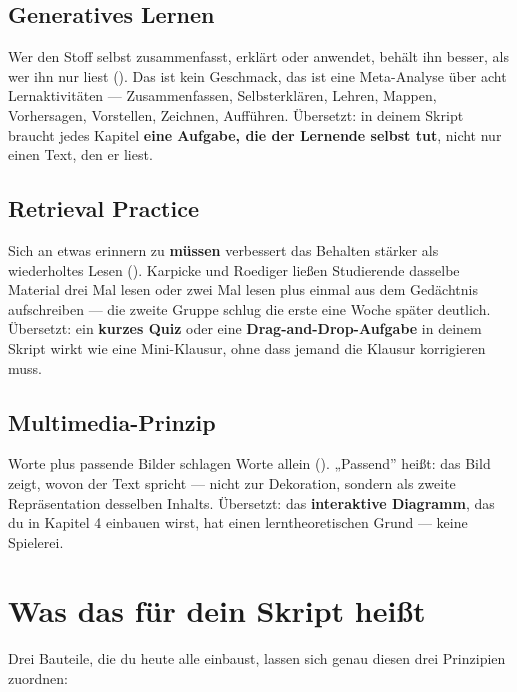 \documentclass[
  ngerman,
  a4paper,
  DIV=11]{scrreprt}
\begin{document}
\subsection{Generatives Lernen}\label{generatives-lernen}

Wer den Stoff selbst zusammenfasst, erklärt oder anwendet, behält ihn
besser, als wer ihn nur liest (). Das ist kein Geschmack, das ist eine Meta-Analyse über
acht Lernaktivitäten --- Zusammenfassen, Selbsterklären, Lehren, Mappen,
Vorhersagen, Vorstellen, Zeichnen, Aufführen. Übersetzt: in deinem
Skript braucht jedes Kapitel \textbf{eine Aufgabe, die der Lernende
selbst tut}, nicht nur einen Text, den er liest.

\subsection{Retrieval Practice}\label{retrieval-practice}

Sich an etwas erinnern zu \textbf{müssen} verbessert das Behalten
stärker als wiederholtes Lesen (). Karpicke und Roediger ließen Studierende dasselbe
Material drei Mal lesen oder zwei Mal lesen plus einmal aus dem
Gedächtnis aufschreiben --- die zweite Gruppe schlug die erste eine
Woche später deutlich. Übersetzt: ein \textbf{kurzes Quiz} oder eine
\textbf{Drag-and-Drop-Aufgabe} in deinem Skript wirkt wie eine
Mini-Klausur, ohne dass jemand die Klausur korrigieren muss.

\subsection{Multimedia-Prinzip}\label{multimedia-prinzip}

Worte plus passende Bilder schlagen Worte allein
(). „Passend'' heißt: das Bild
zeigt, wovon der Text spricht --- nicht zur Dekoration, sondern als
zweite Repräsentation desselben Inhalts. Übersetzt: das
\textbf{interaktive Diagramm}, das du in Kapitel 4 einbauen wirst, hat
einen lerntheoretischen Grund --- keine Spielerei.

\section{Was das für dein Skript
heißt}\label{was-das-fuxfcr-dein-skript-heiuxdft}

Drei Bauteile, die du heute alle einbaust, lassen sich genau diesen drei
Prinzipien zuordnen:
\end{document}
